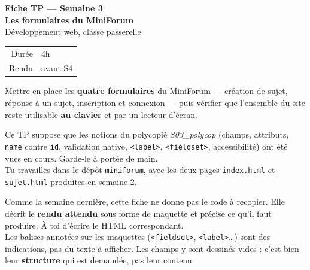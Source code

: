 \documentclass[a4paper,11pt]{article}
\begin{document}

\begin{tcolorbox}[
  colback=accentBlue, colframe=accentBlue,
  arc=4pt, left=12pt, right=12pt, top=10pt, bottom=10pt]
  \begin{minipage}{0.72\linewidth}
    {\color{cfptYellow}\Large\bfseries Fiche TP --- Semaine 3}\\[4pt]
    {\color{white}\Large\bfseries Les formulaires du MiniForum}\\[4pt]
    {\color{lightBlue}\normalsize Développement web, classe passerelle}
  \end{minipage}
  \hfill
  \begin{minipage}{0.24\linewidth}
    \raggedleft
    \begin{tabular}{rl}
      \color{lightBlue}\small Durée & \color{white}\small 4h \\
      \color{lightBlue}\small Rendu & \color{white}\small avant S4 \\
    \end{tabular}
  \end{minipage}
\end{tcolorbox}

\vspace{6pt}
\begin{tcolorbox}[definition, title={Objectif du TP}]
Mettre en place les \textbf{quatre formulaires} du MiniForum --- création de sujet, réponse à un sujet, inscription et connexion --- puis vérifier que l'ensemble du site reste utilisable \textbf{au clavier} et par un lecteur d'écran.
\end{tcolorbox}

\begin{tcolorbox}[astuce, title={Avant de commencer}]
Ce TP suppose que les notions du polycopié \textit{S03\_polycop} (champs, attributs, \texttt{name} contre \texttt{id}, validation native, \texttt{<label>}, \texttt{<fieldset>}, accessibilité) ont été vues en cours. Garde-le à portée de main.\\[3pt]
Tu travailles dans le dépôt \texttt{miniforum}, avec les deux pages \texttt{index.html} et \texttt{sujet.html} produites en semaine 2.
\end{tcolorbox}

\vspace{4pt}
\begin{tcolorbox}[attention, title={Comment lire cette fiche}]
Comme la semaine dernière, cette fiche ne donne pas le code à recopier. Elle décrit le \textbf{rendu attendu} sous forme de maquette et précise ce qu'il faut produire. À toi d'écrire le HTML correspondant.\\[4pt]
Les balises annotées sur les maquettes (\texttt{<fieldset>}, \texttt{<label>}\dots) sont des indications, pas du texte à afficher. Les champs y sont dessinés vides : c'est bien leur \textbf{structure} qui est demandée, pas leur contenu.
\end{tcolorbox}
\end{document}
